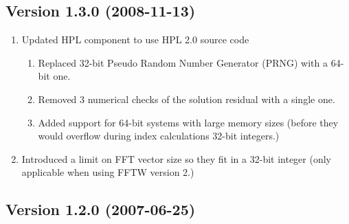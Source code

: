 \documentclass[twocolumn]{article}
\begin{document}
\subsection{Version 1.3.0 (2008-11-13)}
\begin{enumerate}
\item Updated HPL component to use HPL 2.0 source code
  \begin{enumerate}
  \item Replaced 32-bit Pseudo Random Number Generator (PRNG) with a 64-bit one.
  \item Removed 3 numerical checks of the solution residual with a single one.
  \item Added support for 64-bit systems with large memory sizes (before they would
  overflow during index calculations 32-bit integers.)
  \end{enumerate}
\item Introduced a limit on FFT vector size so they fit in a 32-bit integer (only
applicable when using FFTW version 2.)
\end{enumerate}

\subsection{Version 1.2.0 (2007-06-25)}
\end{document}
